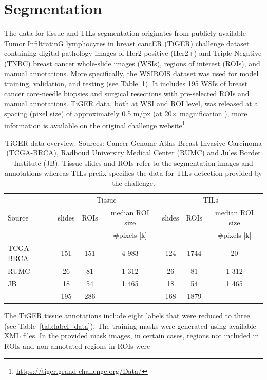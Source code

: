 \section{Segmentation} \label{section:data_segmentation}
The data for tissue and TILs segmentation originates from publicly available
Tumor InfiltratinG lymphocytes in breast cancER (TiGER) challenge dataset containing
digital pathology images of Her2 positive (Her2+) and Triple Negative (TNBC) breast
cancer whole-slide images (WSIs), regions of interest (ROIs), and manual annotations.
More specifically, the WSIROIS dataset was used for model training, validation, and
testing (see Table~\ref*{tab:segm_data}).
It includes 195 WSIs of breast cancer core-needle biopsies and surgical resections with
pre-selected ROIs and manual annotations.
TiGER data, both at WSI and ROI level, was released at a spacing (pixel size) of
approximately 0.5 \textmu m/px (at 20$\times$ magnification ), more information is available on the original
challenge website\footnote{\url{https://tiger.grand-challenge.org/Data/}}.
\begin{table}[h!]
\centering
\begin{tabular}{ l c c c c c c } 
\hline
\multirow{3}{*}{Source} &  \multicolumn{3}{c}{Tissue} & \multicolumn{3}{c}{TILs}\\ 
\cline{2-7}
 & slides & ROIs & median ROI size & slides & ROIs & median ROI size \\ 
  & & & \#pixels [k] & & & \#pixels [k] \\ 
\hline
TCGA-BRCA & 151 & 151 & 4 983 & 124 & 1744 & 20\\ 
RUMC & 26 & 81 & 1 312 & 26 & 81 & 1 312\\ 
JB & 18 & 54 & 1 465 & 18 & 54 & 1 465\\
\hline
 & 195 & 286 & & 168 & 1879 &\\
\end{tabular}
\caption{\label{tab:segm_data}TiGER data overview. Sources: Cancer Genome Atlas Breast Invasive Carcinoma (TCGA-BRCA),
Radboud University Medical Center (RUMC) and Jules Bordet Institute (JB). Tissue slides and ROIs refer to the segmentation
images and annotations whereas TILs prefix specifies the data for TILs detection provided by the challenge. }
\end{table}
The TiGER tissue annotations include eight
labels that were reduced to three (see Table~\ref*{tab:label_data}).
The training masks were generated using available XML files. In the provided mask
images, in certain cases, regions not included in ROIs and non-annotated regions in ROIs were
